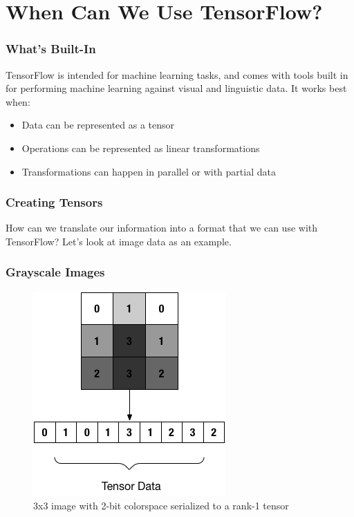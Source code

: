 \documentclass{beamer}
\begin{document}
\section{When Can We Use TensorFlow?}

\begin{frame}
  \frametitle{What's Built-In}

  TensorFlow is intended for machine learning tasks, and comes with
  tools built in for performing machine learning against visual and
  linguistic data.  It works best when:

  \begin{itemize}
  \item Data can be represented as a tensor
  \item Operations can be represented as linear transformations
  \item Transformations can happen in parallel or with partial data
  \end{itemize}
\end{frame}

\begin{frame}
  \frametitle{Creating Tensors}

  How can we translate our information into a format that we can use
  with TensorFlow?  Let's look at image data as an example.
\end{frame}

\begin{frame}
  \frametitle{Grayscale Images}

  \begin{figure}
    \includegraphics[scale=.65]{img/tensor_basic}
    \caption{3x3 image with 2-bit colorspace serialized to a rank-1 tensor}
  \end{figure}
\end{frame}
\end{document}
